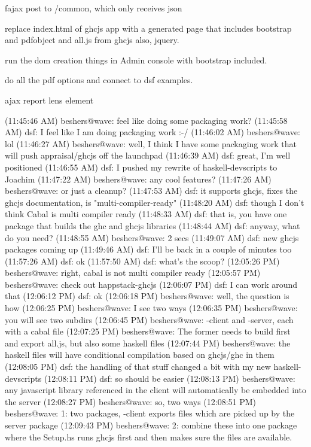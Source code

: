 fajax post to /common, which only receives json


replace index.html of ghcjs app with a generated page that includes bootstrap and pdfobject and all.js from ghcjs
also, jquery.

run the dom creation things in Admin console with bootstrap included.

do all the pdf options and connect to dsf examples.

ajax report lens element


(11:45:46 AM) beshers@wave: feel like doing some packaging work?
(11:45:58 AM) dsf: I feel like I am doing packaging work :-/
(11:46:02 AM) beshers@wave: lol
(11:46:27 AM) beshers@wave: well, I think I have some packaging work that will push appraisal/ghcjs off the launchpad
(11:46:39 AM) dsf: great, I'm well positioned
(11:46:55 AM) dsf: I pushed my rewrite of haskell-devscripts to Joachim
(11:47:22 AM) beshers@wave: any cool features?
(11:47:26 AM) beshers@wave: or just a cleanup?
(11:47:53 AM) dsf: it supports ghcjs, fixes the ghcjs documentation, is "multi-compiler-ready"
(11:48:20 AM) dsf: though I don't think Cabal is multi compiler ready
(11:48:33 AM) dsf: that is, you have one package that builds the ghc and ghcjs libraries
(11:48:44 AM) dsf: anyway, what do you need?
(11:48:55 AM) beshers@wave: 2 secs
(11:49:07 AM) dsf: new ghcjs packages coming up
(11:49:46 AM) dsf: I'll be back in a couple of minutes too
(11:57:26 AM) dsf: ok
(11:57:50 AM) dsf: what's the scoop?
(12:05:26 PM) beshers@wave: right, cabal is not multi compiler ready
(12:05:57 PM) beshers@wave: check out happstack-ghcjs
(12:06:07 PM) dsf: I can work around that
(12:06:12 PM) dsf: ok
(12:06:18 PM) beshers@wave: well, the question is how
(12:06:25 PM) beshers@wave: I see two ways
(12:06:35 PM) beshers@wave: you will see two subdirs
(12:06:45 PM) beshers@wave: -client and -server, each with a cabal file
(12:07:25 PM) beshers@wave: The former needs to build first and export    all.js, but also some haskell files
(12:07:44 PM) beshers@wave: the haskell files will have conditional compilation based on ghcjs/ghc in them
(12:08:05 PM) dsf: the handling of that stuff changed a bit with my new haskell-devscripts
(12:08:11 PM) dsf: so should be easier
(12:08:13 PM) beshers@wave: any javascript library referenced in the client will automatically be embedded into the server
(12:08:27 PM) beshers@wave: so, two ways
(12:08:51 PM) beshers@wave: 1:  two packages, -client exports files which are picked up by the server package
(12:09:43 PM) beshers@wave: 2:  combine these into one package where the Setup.hs runs ghcjs first and then makes sure the files are available.
